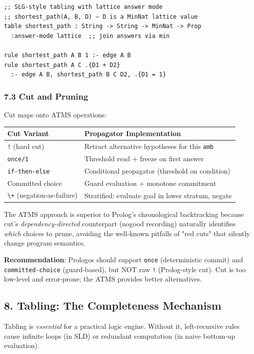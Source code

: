 \documentclass[11pt]{article}
\begin{document}
\begin{verbatim}
;; SLG-style tabling with lattice answer mode
;; shortest_path(A, B, D) — D is a MinNat lattice value
table shortest_path : String -> String -> MinNat -> Prop
  :answer-mode lattice  ;; join answers via min

rule shortest_path A B 1 :- edge A B
rule shortest_path A C .{D1 + D2}
  :- edge A B, shortest_path B C D2, .{D1 = 1}
\end{verbatim}
\subsubsection{7.3 Cut and Pruning}
\label{sec:orgf4679a7}

Cut maps onto ATMS operations:

\begin{center}
\begin{tabular}{ll}
Cut Variant & Propagator Implementation\\
\hline
\texttt{!} (hard cut) & Retract alternative hypotheses for this \texttt{amb}\\
\texttt{once/1} & Threshold read + freeze on first answer\\
\texttt{if-then-else} & Conditional propagator (threshold on condition)\\
Committed choice & Guard evaluation + monotone commitment\\
\texttt{\textbackslash{}+} (negation-as-failure) & Stratified: evaluate goal in lower stratum, negate\\
\end{tabular}
\end{center}

The ATMS approach is superior to Prolog's chronological backtracking
because cut's \emph{dependency-directed} counterpart (nogood recording)
naturally identifies \emph{which} choices to prune, avoiding the well-known
pitfalls of "red cuts" that silently change program semantics.

\textbf{Recommendation}: Prologos should support \texttt{once} (deterministic commit)
and \texttt{committed-choice} (guard-based), but NOT raw \texttt{!} (Prolog-style cut).
Cut is too low-level and error-prone; the ATMS provides better
alternatives.
\subsection{8. Tabling: The Completeness Mechanism}
\label{sec:org437c11f}

Tabling is \emph{essential} for a practical logic engine. Without it, left-recursive
rules cause infinite loops (in SLD) or redundant computation (in naive
bottom-up evaluation).
\end{document}
